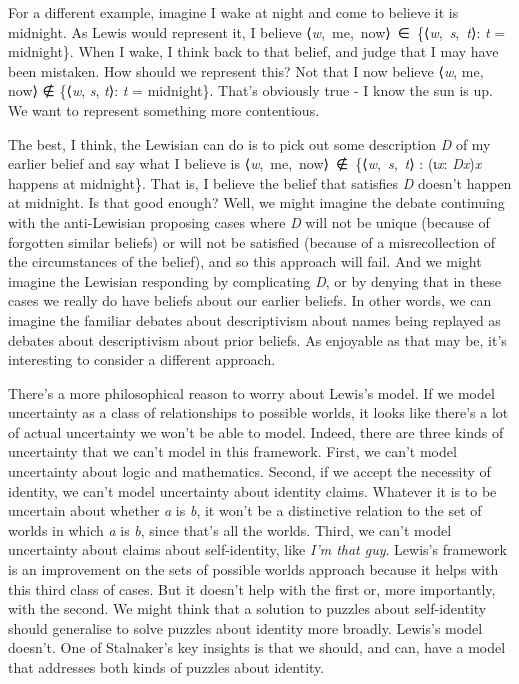 \documentclass[
  11pt,
  letterpaper,
  DIV=11,
  numbers=noendperiod,
  twoside]{scrartcl}
\begin{document}
For a different example, imagine I wake at night and come to believe it
is midnight. As Lewis would represent it, I believe
⟨\emph{w},~me,~now⟩~∈~\{⟨\emph{w},~\emph{s},~\emph{t}⟩: \emph{t} =
midnight\}. When I wake, I think back to that belief, and judge that I
may have been mistaken. How should we represent this? Not that I now
believe ⟨\emph{w}, me, now⟩ ∉ \{⟨\emph{w}, \emph{s}, \emph{t}⟩: \emph{t}
= midnight\}. That's obviously true - I know the sun is up. We want to
represent something more contentious.

The best, I think, the Lewisian can do is to pick out some description
\emph{D} of my earlier belief and say what I believe is
⟨\emph{w},~me,~now⟩~∉~\{⟨\emph{w},~\emph{s},~\emph{t}⟩ : (ɩ\emph{x}:
\emph{Dx})\emph{x} happens at midnight\}. That is, I believe the belief
that satisfies \emph{D} doesn't happen at midnight. Is that good enough?
Well, we might imagine the debate continuing with the anti-Lewisian
proposing cases where \emph{D} will not be unique (because of forgotten
similar beliefs) or will not be satisfied (because of a misrecollection
of the circumstances of the belief), and so this approach will fail. And
we might imagine the Lewisian responding by complicating \emph{D}, or by
denying that in these cases we really do have beliefs about our earlier
beliefs. In other words, we can imagine the familiar debates about
descriptivism about names being replayed as debates about descriptivism
about prior beliefs. As enjoyable as that may be, it's interesting to
consider a different approach.

There's a more philosophical reason to worry about Lewis's model. If we
model uncertainty as a class of relationships to possible worlds, it
looks like there's a lot of actual uncertainty we won't be able to
model. Indeed, there are three kinds of uncertainty that we can't model
in this framework. First, we can't model uncertainty about logic and
mathematics. Second, if we accept the necessity of identity, we can't
model uncertainty about identity claims. Whatever it is to be uncertain
about whether \emph{a} is \emph{b}, it won't be a distinctive relation
to the set of worlds in which \emph{a} is \emph{b}, since that's all the
worlds. Third, we can't model uncertainty about claims about
self-identity, like \emph{I'm that guy}. Lewis's framework is an
improvement on the sets of possible worlds approach because it helps
with this third class of cases. But it doesn't help with the first or,
more importantly, with the second. We might think that a solution to
puzzles about self-identity should generalise to solve puzzles about
identity more broadly. Lewis's model doesn't. One of Stalnaker's key
insights is that we should, and can, have a model that addresses both
kinds of puzzles about identity.
\end{document}

